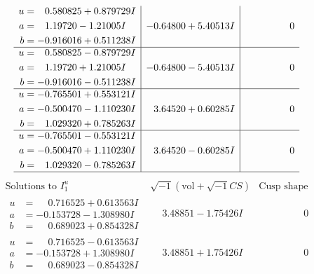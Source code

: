 \documentclass[1p]{elsarticle_modified}
\theoremstyle{definition}
\newcommand{\I}{\sqrt{-1}}
\begin{document}
$$\begin{array}{c|c|c}
\begin{aligned}
u &= \phantom{-}0.580825 + 0.879729 I \\
a &= \phantom{-}1.19720 - 1.21005 I \\
b &= -0.916016 + 0.511238 I\end{aligned}
 & -0.64800 + 5.40513 I & \phantom{-0.000000 } 0 \\ \hline\begin{aligned}
u &= \phantom{-}0.580825 - 0.879729 I \\
a &= \phantom{-}1.19720 + 1.21005 I \\
b &= -0.916016 - 0.511238 I\end{aligned}
 & -0.64800 - 5.40513 I & \phantom{-0.000000 } 0 \\ \hline\begin{aligned}
u &= -0.765501 + 0.553121 I \\
a &= -0.500470 - 1.110230 I \\
b &= \phantom{-}1.029320 + 0.785263 I\end{aligned}
 & \phantom{-}3.64520 + 0.60285 I & \phantom{-0.000000 } 0 \\ \hline\begin{aligned}
u &= -0.765501 - 0.553121 I \\
a &= -0.500470 + 1.110230 I \\
b &= \phantom{-}1.029320 - 0.785263 I\end{aligned}
 & \phantom{-}3.64520 - 0.60285 I & \phantom{-0.000000 } 0\\
 \hline 
 \end{array}$$\newpage$$\begin{array}{c|c|c}  
\text{Solutions to }I^u_{1}& \I (\text{vol} + \sqrt{-1}CS) & \text{Cusp shape}\\
 \hline 
\begin{aligned}
u &= \phantom{-}0.716525 + 0.613563 I \\
a &= -0.153728 - 1.308980 I \\
b &= \phantom{-}0.689023 + 0.854328 I\end{aligned}
 & \phantom{-}3.48851 - 1.75426 I & \phantom{-0.000000 } 0 \\ \hline\begin{aligned}
u &= \phantom{-}0.716525 - 0.613563 I \\
a &= -0.153728 + 1.308980 I \\
b &= \phantom{-}0.689023 - 0.854328 I\end{aligned}
 & \phantom{-}3.48851 + 1.75426 I & \phantom{-0.000000 } 0 \\ \hline\begin{aligned}

\end{aligned}
\end{array}$$
\end{document}
